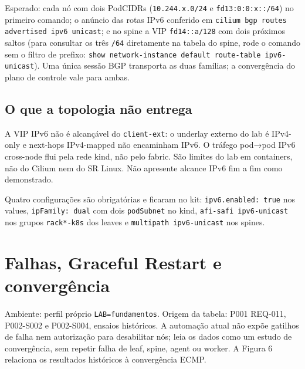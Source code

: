 \documentclass[12pt,openany,oneside,a4paper,chapter=TITLE,english,brazil]{abntex2}
\begin{document}
Esperado: cada nó com dois PodCIDRs (\texttt{10.\allowbreak{}244.\allowbreak{}x.\allowbreak{}0/\allowbreak{}24} e \texttt{fd13:\allowbreak{}0:\allowbreak{}0:\allowbreak{}x:\allowbreak{}:\allowbreak{}/\allowbreak{}64}) no primeiro comando; o anúncio das rotas IPv6 conferido em \texttt{cilium bgp routes advertised ipv6 unicast}; e no spine a VIP \texttt{fd14:\allowbreak{}:\allowbreak{}a/\allowbreak{}128} com dois próximos saltos (para consultar os três \texttt{/\allowbreak{}64} diretamente na tabela do spine, rode o comando sem o filtro de prefixo: \texttt{show network-{}\allowbreak{}instance default route-{}\allowbreak{}table ipv6-{}\allowbreak{}unicast}). Uma única
sessão BGP transporta as duas famílias; a convergência do plano de controle
vale para ambas.

\section{O que a topologia não entrega}\label{o-que-a-topologia-nuxe3o-entrega}

A VIP IPv6 não é alcançável do \texttt{client-{}\allowbreak{}ext}: o underlay externo do lab é
IPv4-only e next-hops IPv4-mapped não encaminham IPv6. O tráfego pod→pod IPv6
cross-node flui pela rede kind, não pelo fabric. São limites do lab em
containers, não do Cilium nem do SR Linux. Não apresente alcance IPv6 fim a fim
como demonstrado.

Quatro configurações são obrigatórias e ficaram no kit: \texttt{ipv6.\allowbreak{}enabled:\allowbreak{} true}
nos values, \texttt{ip\allowbreak{}Family:\allowbreak{} dual} com dois \texttt{pod\allowbreak{}Subnet} no kind, \texttt{afi-{}\allowbreak{}safi ipv6-{}\allowbreak{}unicast} nos grupos \texttt{rack*-{}\allowbreak{}k8s} dos leaves e \texttt{multipath ipv6-{}\allowbreak{}unicast} nos
spines.

\chapter{Falhas, Graceful Restart e convergência}\label{falhas-graceful-restart-e-converguxeancia}

Ambiente: perfil próprio \texttt{LAB=\allowbreak{}fundamentos}. Origem da tabela: P001 REQ-011,
P002-S002 e P002-S004, ensaios históricos. A automação atual não expõe gatilhos
de falha nem autorização para desabilitar nós; leia os dados como um estudo de
convergência, sem repetir falha de leaf, spine, agent ou worker. A Figura 6
relaciona os resultados históricos à convergência ECMP.
\end{document}

